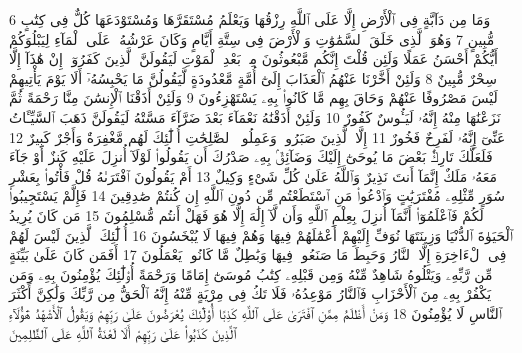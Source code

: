 {\tiny\colorbox{cl_aya}{6}} وَمَا مِن دَآبَّةٍ فِى ٱلْأَرْضِ إِلَّا عَلَى ٱللَّهِ رِزْقُهَا وَيَعْلَمُ مُسْتَقَرَّهَا وَمُسْتَوْدَعَهَا كُلٌّ فِى كِتَٰبٍ مُّبِينٍ
{\tiny\colorbox{cl_aya}{7}} وَهُوَ ٱلَّذِى خَلَقَ ٱلسَّمَٰوَٰتِ وَٱلْأَرْضَ فِى سِتَّةِ أَيَّامٍ وَكَانَ عَرْشُهُۥ عَلَى ٱلْمَآءِ لِيَبْلُوَكُمْ أَيُّكُمْ أَحْسَنُ عَمَلًا وَلَئِن قُلْتَ إِنَّكُم مَّبْعُوثُونَ مِنۢ بَعْدِ ٱلْمَوْتِ لَيَقُولَنَّ ٱلَّذِينَ كَفَرُوٓا۟ إِنْ هَٰذَآ إِلَّا سِحْرٌ مُّبِينٌ
{\tiny\colorbox{cl_aya}{8}} وَلَئِنْ أَخَّرْنَا عَنْهُمُ ٱلْعَذَابَ إِلَىٰٓ أُمَّةٍ مَّعْدُودَةٍ لَّيَقُولُنَّ مَا يَحْبِسُهُۥٓ أَلَا يَوْمَ يَأْتِيهِمْ لَيْسَ مَصْرُوفًا عَنْهُمْ وَحَاقَ بِهِم مَّا كَانُوا۟ بِهِۦ يَسْتَهْزِءُونَ
{\tiny\colorbox{cl_aya}{9}} وَلَئِنْ أَذَقْنَا ٱلْإِنسَٰنَ مِنَّا رَحْمَةً ثُمَّ نَزَعْنَٰهَا مِنْهُ إِنَّهُۥ لَيَـُٔوسٌ كَفُورٌ
{\tiny\colorbox{cl_aya}{10}} وَلَئِنْ أَذَقْنَٰهُ نَعْمَآءَ بَعْدَ ضَرَّآءَ مَسَّتْهُ لَيَقُولَنَّ ذَهَبَ ٱلسَّيِّـَٔاتُ عَنِّىٓ إِنَّهُۥ لَفَرِحٌ فَخُورٌ
{\tiny\colorbox{cl_aya}{11}} إِلَّا ٱلَّذِينَ صَبَرُوا۟ وَعَمِلُوا۟ ٱلصَّٰلِحَٰتِ أُو۟لَٰٓئِكَ لَهُم مَّغْفِرَةٌ وَأَجْرٌ كَبِيرٌ
{\tiny\colorbox{cl_aya}{12}} فَلَعَلَّكَ تَارِكٌۢ بَعْضَ مَا يُوحَىٰٓ إِلَيْكَ وَضَآئِقٌۢ بِهِۦ صَدْرُكَ أَن يَقُولُوا۟ لَوْلَآ أُنزِلَ عَلَيْهِ كَنزٌ أَوْ جَآءَ مَعَهُۥ مَلَكٌ إِنَّمَآ أَنتَ نَذِيرٌ وَٱللَّهُ عَلَىٰ كُلِّ شَىْءٍ وَكِيلٌ
{\tiny\colorbox{cl_aya}{13}} أَمْ يَقُولُونَ ٱفْتَرَىٰهُ قُلْ فَأْتُوا۟ بِعَشْرِ سُوَرٍ مِّثْلِهِۦ مُفْتَرَيَٰتٍ وَٱدْعُوا۟ مَنِ ٱسْتَطَعْتُم مِّن دُونِ ٱللَّهِ إِن كُنتُمْ صَٰدِقِينَ
{\tiny\colorbox{cl_aya}{14}} فَإِلَّمْ يَسْتَجِيبُوا۟ لَكُمْ فَٱعْلَمُوٓا۟ أَنَّمَآ أُنزِلَ بِعِلْمِ ٱللَّهِ وَأَن لَّآ إِلَٰهَ إِلَّا هُوَ فَهَلْ أَنتُم مُّسْلِمُونَ
{\tiny\colorbox{cl_aya}{15}} مَن كَانَ يُرِيدُ ٱلْحَيَوٰةَ ٱلدُّنْيَا وَزِينَتَهَا نُوَفِّ إِلَيْهِمْ أَعْمَٰلَهُمْ فِيهَا وَهُمْ فِيهَا لَا يُبْخَسُونَ
{\tiny\colorbox{cl_aya}{16}} أُو۟لَٰٓئِكَ ٱلَّذِينَ لَيْسَ لَهُمْ فِى ٱلْءَاخِرَةِ إِلَّا ٱلنَّارُ وَحَبِطَ مَا صَنَعُوا۟ فِيهَا وَبَٰطِلٌ مَّا كَانُوا۟ يَعْمَلُونَ
{\tiny\colorbox{cl_aya}{17}} أَفَمَن كَانَ عَلَىٰ بَيِّنَةٍ مِّن رَّبِّهِۦ وَيَتْلُوهُ شَاهِدٌ مِّنْهُ وَمِن قَبْلِهِۦ كِتَٰبُ مُوسَىٰٓ إِمَامًا وَرَحْمَةً أُو۟لَٰٓئِكَ يُؤْمِنُونَ بِهِۦ وَمَن يَكْفُرْ بِهِۦ مِنَ ٱلْأَحْزَابِ فَٱلنَّارُ مَوْعِدُهُۥ فَلَا تَكُ فِى مِرْيَةٍ مِّنْهُ إِنَّهُ ٱلْحَقُّ مِن رَّبِّكَ وَلَٰكِنَّ أَكْثَرَ ٱلنَّاسِ لَا يُؤْمِنُونَ
{\tiny\colorbox{cl_aya}{18}} وَمَنْ أَظْلَمُ مِمَّنِ ٱفْتَرَىٰ عَلَى ٱللَّهِ كَذِبًا أُو۟لَٰٓئِكَ يُعْرَضُونَ عَلَىٰ رَبِّهِمْ وَيَقُولُ ٱلْأَشْهَٰدُ هَٰٓؤُلَآءِ ٱلَّذِينَ كَذَبُوا۟ عَلَىٰ رَبِّهِمْ أَلَا لَعْنَةُ ٱللَّهِ عَلَى ٱلظَّٰلِمِينَ
